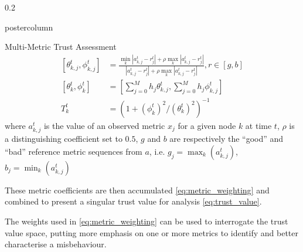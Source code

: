 \documentclass[final,hyperref={pdfpagelabels=false}]{beamer}
\def\colwidth{0.2\linewidth}
\begin{document}
\begin{frame}[fragile]
\begin{columns}[T]
\begin{column}{\colwidth}
\begin{beamercolorbox}[center,wd=\textwidth]{postercolumn}
\begin{minipage}[T]{.98\textwidth}
{\begin{block}{Multi-Metric Trust Assessment}
                \begin{align}
                  \label{eq:grc}
                  [\theta_{k,j}^t,\phi_{k,j}^t]  &= \frac{\min_k|a_{k,j}^t - r_j^t| + \rho \max_k|a_{k,j}^t-r_j^t|}{|a_{k,j}^t-r_j^t| + \rho \max_k|a_{k,j}^t-r_j^t|},  r \in [g,b]\\
                  \label{eq:metric_weighting}
                  [\theta_k^t, \phi_k^t] &= \left[\sum_{j=0}^M h_j \theta_{k,j}^t,\sum_{j=0}^M h_j \phi_{k,j}^t \right]\\
                  \label{eq:trust_value}
                  T_k^t &= ({1+{(\phi_k^t)^2}/{(\theta_k^t)^2}})^{-1}
                \end{align}
                where $a_{k,j}^t$ is the value of an observed metric $x_j$ for a given node $k$ at time $t$, $\rho$ is a distinguishing coefficient set to $0.5$, $g$ and $b$ are respectively the ``good'' and ``bad'' reference metric sequences from $a$, i.e. $g_j=\max_k({a_{k,j}^t})$,  $b_j=\min_k({a_{k,j}^t})$ 

                These metric coefficients are then accumulated \eqref{eq:metric_weighting} and combined to present a singular trust value for analysis \eqref{eq:trust_value}.

                The weights used in \eqref{eq:metric_weighting} can be used to interrogate the trust value space, putting more emphasis on one or more metrics to identify and better characterise a misbehaviour.

						\end{block}

						
						
					}
				\end{minipage}
			\end{beamercolorbox}
		\end{column}
		

\end{columns}
\end{frame}
\end{document}
